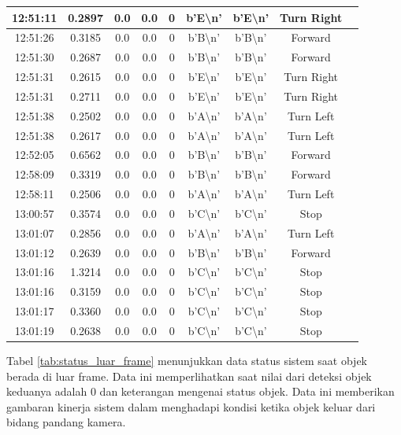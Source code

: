 \begin{table}[H]
\begin{tabular}{|c|c|c|c|c|c|c|c|c|}
    12:51:11 & 0.2897 & 0.0 & 0.0 & 0 & b'E\textbackslash n' & b'E\textbackslash n' & Turn Right \\ \hline
    12:51:26 & 0.3185 & 0.0 & 0.0 & 0 & b'B\textbackslash n' & b'B\textbackslash n' & Forward \\ \hline
    12:51:30 & 0.2687 & 0.0 & 0.0 & 0 & b'B\textbackslash n' & b'B\textbackslash n' & Forward \\ \hline
    12:51:31 & 0.2615 & 0.0 & 0.0 & 0 & b'E\textbackslash n' & b'E\textbackslash n' & Turn Right \\ \hline
    12:51:31 & 0.2711 & 0.0 & 0.0 & 0 & b'E\textbackslash n' & b'E\textbackslash n' & Turn Right \\ \hline
    12:51:38 & 0.2502 & 0.0 & 0.0 & 0 & b'A\textbackslash n' & b'A\textbackslash n' & Turn Left \\ \hline
    12:51:38 & 0.2617 & 0.0 & 0.0 & 0 & b'A\textbackslash n' & b'A\textbackslash n' & Turn Left \\ \hline
    12:52:05 & 0.6562 & 0.0 & 0.0 & 0 & b'B\textbackslash n' & b'B\textbackslash n' & Forward \\ \hline
    12:58:09 & 0.3319 & 0.0 & 0.0 & 0 & b'B\textbackslash n' & b'B\textbackslash n' & Forward \\ \hline
    12:58:11 & 0.2506 & 0.0 & 0.0 & 0 & b'A\textbackslash n' & b'A\textbackslash n' & Turn Left \\ \hline
    13:00:57 & 0.3574 & 0.0 & 0.0 & 0 & b'C\textbackslash n' & b'C\textbackslash n' & Stop \\ \hline
    13:01:07 & 0.2856 & 0.0 & 0.0 & 0 & b'A\textbackslash n' & b'A\textbackslash n' & Turn Left \\ \hline
    13:01:12 & 0.2639 & 0.0 & 0.0 & 0 & b'B\textbackslash n' & b'B\textbackslash n' & Forward \\ \hline
    13:01:16 & 1.3214 & 0.0 & 0.0 & 0 & b'C\textbackslash n' & b'C\textbackslash n' & Stop \\ \hline
    13:01:16 & 0.3159 & 0.0 & 0.0 & 0 & b'C\textbackslash n' & b'C\textbackslash n' & Stop \\ \hline
    13:01:17 & 0.3360 & 0.0 & 0.0 & 0 & b'C\textbackslash n' & b'C\textbackslash n' & Stop \\ \hline
    13:01:19 & 0.2638 & 0.0 & 0.0 & 0 & b'C\textbackslash n' & b'C\textbackslash n' & Stop \\ \hline
    \end{tabular}
\end{table}
Tabel \ref{tab:status_luar_frame} menunjukkan data status sistem saat objek berada di luar frame. Data ini memperlihatkan saat nilai dari deteksi objek keduanya adalah 0 dan keterangan mengenai status objek. Data ini memberikan gambaran kinerja sistem dalam menghadapi kondisi ketika objek keluar dari bidang pandang kamera.

